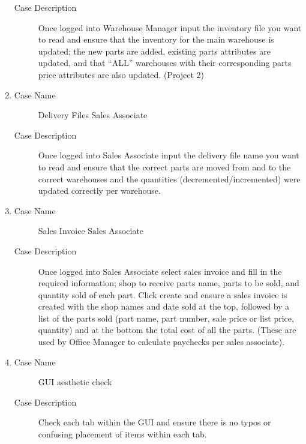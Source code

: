 \documentclass{report}
\begin{document}
\begin{enumerate}
\begin{description}
          \item [Case Description] Once logged into Warehouse Manager input the inventory file you want to read and ensure that the inventory for the main warehouse is updated; the new parts are added, existing parts attributes are updated, and that “ALL” warehouses with their corresponding parts price attributes are also updated. (Project 2)
        \end{description}
  \item \begin{description}
          \item [Case Name] Delivery Files Sales Associate
          \item [Case Description] Once logged into Sales Associate input the delivery file name you want to read and ensure that the correct parts are moved from and to the correct warehouses and the quantities (decremented/incremented) were updated correctly per warehouse.
        \end{description}
  \item \begin{description}
          \item [Case Name] Sales Invoice Sales Associate
          \item [Case Description] Once logged into Sales Associate select sales invoice and fill in the required information; shop to receive parts name, parts to be sold, and quantity sold of each part. Click create and ensure a sales invoice is created with the shop names and date sold at the top, followed by a list of the parts sold (part name, part number, sale price or list price, quantity) and at the bottom the total cost of all the parts. (These are used by Office Manager to calculate paychecks per sales associate).
        \end{description}
  \item \begin{description}
          \item [Case Name] GUI aesthetic check
          \item [Case Description] Check each tab within the GUI and ensure there is no typos or confusing placement of items within each tab.
        \end{description}
\end{enumerate}
\end{document}
